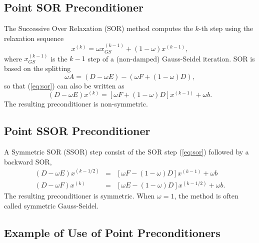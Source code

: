 \subsection{Point SOR Preconditioner}
\label{sec:sor}

The Successive Over Relaxation (SOR) method computes the $k$-th step 
using the relaxation sequence
\begin{equation}
\label{eq:sor}
x^{(k)} = \omega x_{GS}^{(k-1)} + (1 - \omega) x^{(k-1)}, 
\end{equation}
where $x_{GS}^{(k-1)}$ is the $k-1$ step of a (non-damped) Gauss-Seidel
iteration. SOR is based on the splitting 
\[
\omega A = (D - \omega E) - (\omega F + (1 - \omega) D ) ,
\]
so that (\ref{eq:sor}) can also be written as
\[
(D - \omega E) x^{(k)} = \left[
\omega F + (1 - \omega ) D
\right] x^{(k-1)} + \omega b.
\]
The resulting preconditioner is non-symmetric.

\subsection{Point SSOR Preconditioner}
\label{sec:ssor}

A Symmetric SOR (SSOR) step consist of the SOR step (\ref{eq:sor}) followed by
a backward SOR,
\begin{equation}
\label{eq:ssor}
\begin{array}{rcl}
(D - \omega E) x^{(k-1/2)} &= &[ \omega F - (1 - \omega)D] x^{(k-1)} + \omega b \\
(D - \omega F) x^{(k)} &=& [ \omega E - (1 - \omega)D] x^{(k-1/2)} + \omega b .
\end{array}
\end{equation}
The resulting preconditioner is symmetric. When $\omega = 1$, the method
is often called symmetric Gauss-Seidel.

\subsection{Example of Use of Point Preconditioners}
\label{sec:point_ex}

